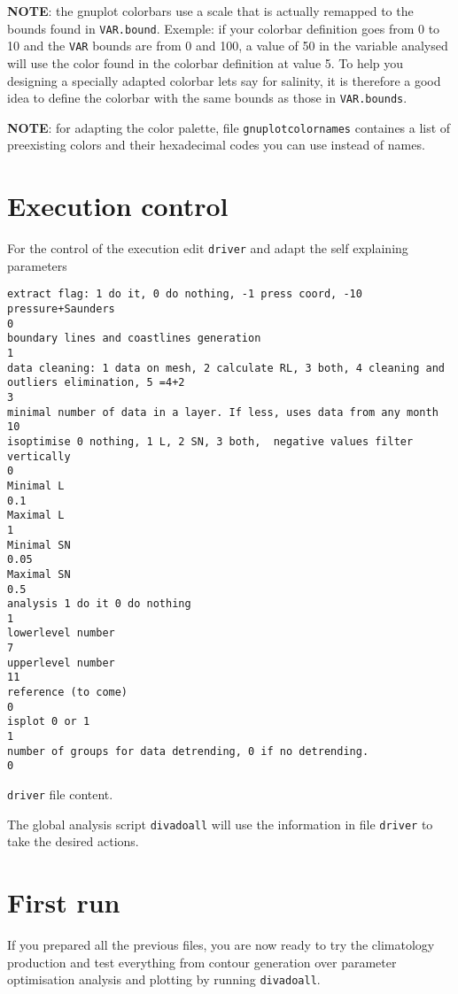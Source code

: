 \documentclass[8pt,a4paper,notitlepage]{book}
\begin{document}
{\bf NOTE}: the gnuplot colorbars use a scale that is actually remapped to the bounds found in {\tt VAR.bound}. Exemple:
if your colorbar definition goes from 0 to 10 and the {\tt VAR} bounds are from 0 and 100, a value of 50 in the variable analysed will use the color found in the colorbar definition at value 5. To help you designing a specially adapted colorbar lets say for salinity, it is therefore a good idea to define the colorbar with the same bounds as those in {\tt VAR.bounds}.

{\bf NOTE}: for adapting the color palette, file {\tt gnuplotcolornames} containes a list of preexisting colors and their hexadecimal codes you can use instead of names.


\section{Execution control}

For the control of the execution edit {\tt driver} and adapt the self explaining parameters
\begin{exfile}[H]
\begin{footnotesize}
\begin{verbatim}
extract flag: 1 do it, 0 do nothing, -1 press coord, -10 pressure+Saunders
0
boundary lines and coastlines generation
1
data cleaning: 1 data on mesh, 2 calculate RL, 3 both, 4 cleaning and outliers elimination, 5 =4+2
3
minimal number of data in a layer. If less, uses data from any month
10
isoptimise 0 nothing, 1 L, 2 SN, 3 both,  negative values filter vertically
0
Minimal L
0.1
Maximal L
1
Minimal SN
0.05
Maximal SN
0.5
analysis 1 do it 0 do nothing
1
lowerlevel number
7
upperlevel number
11
reference (to come)
0
isplot 0 or 1
1
number of groups for data detrending, 0 if no detrending.
0
\end{verbatim}
\end{footnotesize}
\caption{{\tt driver} file content.} 
\end{exfile}



The global analysis script {\tt divadoall} will use the information in file {\tt driver} to take the desired actions.

\section{First run}

If you prepared all the previous files, you are now ready to try the climatology production and test 
everything from contour generation over parameter optimisation analysis and plotting
by running  {\tt divadoall}.
\end{document}
